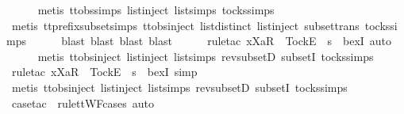 \begin{isabellebody}
\ \ \ \ \isamarkupfalse%
\ {\isacharparenleft}metis\ ttobs{\isachardot}simps{\isacharparenleft}{}{\isacharparenright}\ list{\isachardot}inject\ list{\isachardot}simps{\isacharparenleft}{}{\isacharparenright}\ tocks{\isachardot}simps{\isacharparenright}\isanewline
\ \ \ \ \isamarkupfalse%
\ {\isacharparenleft}metis\ tt{\isacharunderscore}prefix{\isacharunderscore}subset{\isachardot}simps{\isacharparenleft}{}{\isacharparenright}\ ttobs{\isachardot}inject{\isacharparenleft}{}{\isacharparenright}\ list{\isachardot}distinct{\isacharparenleft}{}{\isacharparenright}\ list{\isachardot}inject\ subset{\isacharunderscore}trans\ tocks{\isachardot}simps{\isacharparenright}\isanewline
\ \ \ \ \isamarkupfalse%
\ {\isacharparenleft}blast{\isacharcomma}\ blast{\isacharcomma}\ blast{\isacharcomma}\ blast{\isacharparenright}\isanewline
\ \ \ \ \isamarkupfalse%
\ {\isacharparenleft}rule{\isacharunderscore}tac\ x{\isacharequal}{\isachardoublequoteopen}{\isacharbrackleft}Xa{\isacharbrackright}\isactrlsub R\ {\isacharhash}\ {\isacharbrackleft}Tock{\isacharbrackright}\isactrlsub E\ {\isacharhash}\ s{\isacharprime}{\isachardoublequoteclose}\ \ bexI{\isacharcomma}\ auto{\isacharparenright}\isanewline
\ \ \ \ \isamarkupfalse%
\ {\isacharparenleft}metis\ ttobs{\isachardot}inject{\isacharparenleft}{}{\isacharparenright}\ list{\isachardot}inject\ list{\isachardot}simps{\isacharparenleft}{}{\isacharparenright}\ rev{\isacharunderscore}subsetD\ subsetI\ tocks{\isachardot}simps{\isacharparenright}\isanewline
\ \ \ \ \isamarkupfalse%
\ {\isacharparenleft}rule{\isacharunderscore}tac\ x{\isacharequal}{\isachardoublequoteopen}{\isacharbrackleft}Xa{\isacharbrackright}\isactrlsub R\ {\isacharhash}\ {\isacharbrackleft}Tock{\isacharbrackright}\isactrlsub E\ {\isacharhash}\ s{\isacharprime}{\isachardoublequoteclose}\ \ bexI{\isacharcomma}\ simp{\isacharparenright}\isanewline
\ \ \ \ \isamarkupfalse%
\ {\isacharparenleft}metis\ ttobs{\isachardot}inject{\isacharparenleft}{}{\isacharparenright}\ list{\isachardot}inject\ list{\isachardot}simps{\isacharparenleft}{}{\isacharparenright}\ rev{\isacharunderscore}subsetD\ subsetI\ tocks{\isachardot}simps{\isacharparenright}\isanewline
\ \ \ \ \isamarkupfalse%
\ {\isacharparenleft}case{\isacharunderscore}tac\ {\isasymsigma}\ rule{\isacharcolon}ttWF{\isachardot}cases{\isacharcomma}\ auto{\isacharparenright}{\isacharplus}\isanewline

\end{isabellebody}
